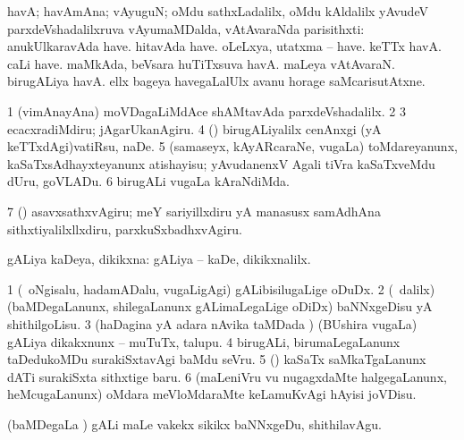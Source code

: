 {\bentry
{} 
\gl{\nA}
\expl{}
\bmng
havA; havAmAna; vAyuguN; oMdu sathxLadalilx, oMdu kAldalilx yAvudeV parxdeVshadalilxruva vAyumaMDalda, vAtAvaraNda parisithxti:  anukUlkaravAda have.  hitavAda have.  oLeLxya, utatxma -- have.  keTTx havA.  caLi have.  maMkAda, beVsara huTiTxsuva havA.  maLeya vAtAvaraN.  birugALiya havA.  ellx bageya havegaLalUlx avanu horage saMcarisutAtxne. 
\emng

\noindent 
\gl{\pagu}
\expl{}
\bmng
\bnum
\num{1}  (vimAnayAna) moVDagaLiMdAce shAMtavAda parxdeVshadalilx. 
\num{2}  
\num{3}  ecacxradiMdiru; jAgarUkanAgiru. 
\num{4}  (\nw) birugALiyalilx cenAnxgi (yA keTTxdAgi)vatiRsu, naDe. 
\num{5}  (samaseyx, kAyARcaraNe, \mo vugaLa) toMdareyanunx, kaSaTxsAdhayxteyanunx atishayisu; yAvudanenxV Agali tiVra kaSaTxveMdu dUru, goVLADu. 
\num{6}  birugALi \mo vugaLa kAraNdiMda. 
\num{7}  (\AmA) asavxsathxvAgiru; meY sariyillxdiru yA manasusx samAdhAna sithxtiyalilxllxdiru, parxkuSxbadhxvAgiru. 
\enum
\emng
\eentry

\bentry
{} 
\gl{\gu}
\expl{}
\bmng
gALiya kaDeya, dikikxna:  gALiya -- kaDe, dikikxnalilx. 
\emng
\eentry

\bentry
{} 
\gl{\sakirx}
\expl{}
\bmng
\bnum
\num{1} (\kanmu\ oNgisalu, hadamADalu, \mo vugaLigAgi) gALibisilugaLige oDuDx. 
\num{2} (\sA\ \kaparx dalilx) (baMDegaLanunx, shilegaLanunx gALimaLegaLige oDiDx) baNNxgeDisu yA shithilgoLisu. 
\num{3} (haDagina yA adara nAvika taMDada \vi) (BUshira \mo vugaLa) gALiya dikakxnunx -- muTuTx, talupu. 
\num{4} birugALi, birumaLegaLanunx taDedukoMDu surakiSxtavAgi baMdu seVru. 
\num{5} (\rUpa) kaSaTx saMkaTgaLanunx dATi surakiSxta sithxtige baru. 
\num{6} (maLeniVru \mo vu nugagxdaMte halgegaLanunx, heMcugaLanunx) oMdara meVloMdaraMte keLamuKvAgi hAyisi joVDisu. 
\enum
\emng

\noindent 
\gl{\akirx}
\expl{}
\bmng
(baMDegaLa \vi) gALi maLe \mo vakekx sikikx baNNxgeDu, shithilavAgu. 
\emng
\eentry

}
